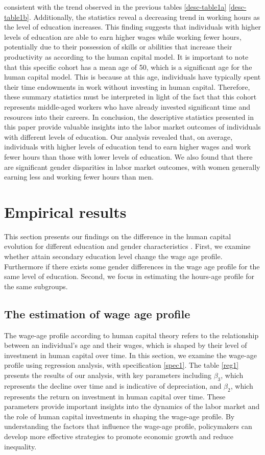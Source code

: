 \documentclass[14pt]{sistedes}
\begin{document}
consistent with the trend observed in the previous  tables \ref{desc-table1a} \ref{desc-table1b}. Additionally, the
statistics reveal a decreasing trend in working hours as the level of education increases. This finding suggests that
individuals with higher levels of education are able to earn higher wages while working fewer hours, potentially due to
their possession of skills or abilities that increase their productivity as according to the human capital model. It is
important to note that this specific cohort has a mean age of 50, which is a significant age for the human capital
model. This is because at this age, individuals have typically spent their time endowments in work without investing in
human capital. Therefore, these summary statistics must be interpreted in light of the fact that this cohort represents
middle-aged workers who have already invested significant time and resources into their careers.\newline
In conclusion, the descriptive statistics presented in this paper provide valuable insights into the labor market
outcomes of individuals with different levels of education. Our analysis revealed that, on average, individuals with
higher levels of education tend to earn higher wages and work fewer hours than those with lower levels of education. We
also found that there are significant gender disparities in labor market outcomes, with women generally earning less and
working fewer hours than men.
\section{Empirical results}
This section presents our findings on the difference in the human capital evolution for different education and gender
characteristics . First, we examine whether attain secondary education level change the wage age profile. Furthermore if
there exists some gender differences in the wage age profile for the same level of education. Second, we focus in
estimating the hours-age profile for the same subgroups.
\subsection{The estimation of wage age profile}
The wage-age profile according to human capital theory refers to the relationship between an individual's age and their
wages, which is shaped by their level of investment in human capital over time. In this section, we examine the wage-age
profile using regression analysis, with specification \ref{spec1}. The table \ref{reg1} presents the results of our
analysis, with key parameters including \(\beta_3\), which represents the decline over time and is indicative of
depreciation, and \(\beta_2\), which represents the return on investment in human capital over time. These parameters
provide important insights into the dynamics of the labor market and the role of human capital investments in shaping
the wage-age profile. By understanding the factors that influence the wage-age profile, policymakers can develop more
effective strategies to promote economic growth and reduce inequality.
\end{document}
